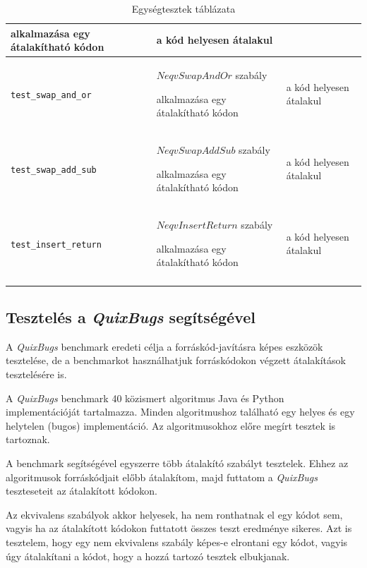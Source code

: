 \begin{center}
\begin{longtable}{ | p{} | p{} | p{} | }
		alkalmazása egy átalakítható kódon
		&
		a kód helyesen átalakul
		\\
		\hline

		\texttt{\lstinline{test_swap_and_or}}
		&
		$NeqvSwapAndOr$ szabály
		
		alkalmazása egy átalakítható kódon
		&
		a kód helyesen átalakul
		\\
		\hline

		\texttt{\lstinline{test_swap_add_sub}}
		&
		$NeqvSwapAddSub$ szabály
		
		alkalmazása egy átalakítható kódon
		&
		a kód helyesen átalakul
		\\
		\hline

		\texttt{\lstinline{test_insert_return}}
		&
		$NeqvInsertReturn$ szabály
		
		alkalmazása egy átalakítható kódon
		&
		a kód helyesen átalakul
		\\
		\hline

		\caption{Egységtesztek táblázata}
		\label{tab:unit_tests}
	\end{longtable}
\end{center}

\pagebreak

\subsection{Tesztelés a \emph{QuixBugs} segítségével\label{sec:QuixBugs}}


A \emph{QuixBugs} benchmark eredeti célja a forráskód-javításra képes eszközök tesztelése,
de a benchmarkot használhatjuk forráskódokon végzett átalakítások tesztelésére is.

A \emph{QuixBugs} benchmark 40 közismert algoritmus Java és Python implementációját tartalmazza.
Minden algoritmushoz található egy helyes és egy helytelen (bugos) implementáció.
Az algoritmusokhoz előre megírt tesztek is tartoznak.

A benchmark segítségével egyszerre több átalakító szabályt tesztelek.
Ehhez az algoritmusok forráskódjait előbb átalakítom, majd futtatom a \emph{QuixBugs}
teszteseteit az átalakított kódokon.

Az ekvivalens szabályok akkor helyesek, ha nem ronthatnak el egy kódot sem,
vagyis ha az átalakított kódokon futtatott összes teszt eredménye sikeres.
Azt is tesztelem, hogy egy nem ekvivalens szabály képes-e elrontani egy kódot,
vagyis úgy átalakítani a kódot, hogy a hozzá tartozó tesztek elbukjanak.

